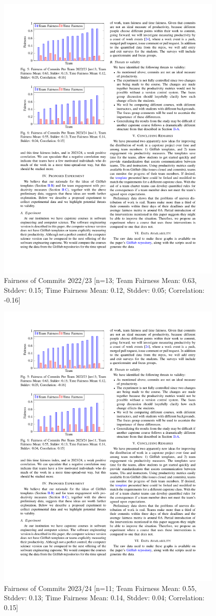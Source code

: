 \documentclass[poster, a1, plainboxedsections]{sciposter}
\begin{document}
\begin{multicols}{2}
\begin{figure}[h]
\centering
\includegraphics[width=0.7\linewidth]{../figures/FairnessCommits_22_23.pdf}
\caption{Fairness of Commits 2022/23 [n=13; Team Fairness Mean: 0.63, Stddev: 0.15; Time Fairness Mean: 0.12, Stddev: 0.05; Correlation: -0.16]}\label{Fig:Fairness2022/23}
\end{figure}

\begin{figure}[h]
\centering
\includegraphics[width=0.7\linewidth]{../figures/FairnessCommits_23_24.pdf}
\caption{Fairness of Commits 2023/24 [n=11; Team Fairness Mean: 0.55, Stddev: 0.13; Time Fairness Mean: 0.14, Stddev: 0.04; Correlation: 0.15]}\label{Fig:Fairness2023/24}
\end{figure}


\end{multicols}
\end{document}
